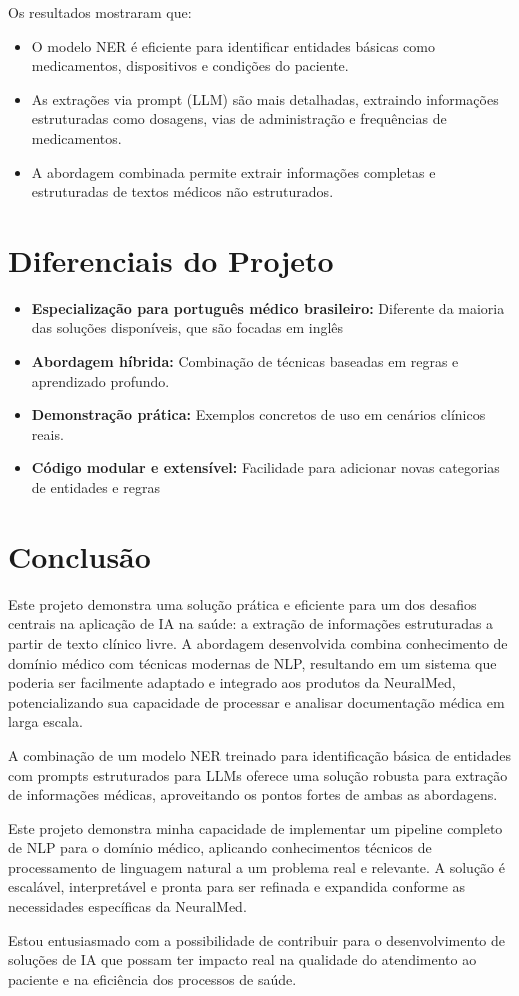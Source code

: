 \documentclass{article}
\begin{document}
\noindent Os resultados mostraram que:
\begin{itemize}
    \item O modelo NER é eficiente para identificar entidades básicas como medicamentos, dispositivos e condições do paciente.
    \item As extrações via prompt (LLM) são mais detalhadas, extraindo informações estruturadas como dosagens, vias de administração e frequências de medicamentos.
    \item A abordagem combinada permite extrair informações completas e estruturadas de textos médicos não estruturados.
\end{itemize}
\section{Diferenciais do Projeto}
\begin{itemize}
    \item \textbf{Especialização para português médico brasileiro:}  Diferente da maioria das soluções disponíveis, que são focadas em inglês
    \item \textbf{Abordagem híbrida:} Combinação de técnicas baseadas em regras e aprendizado profundo.
    \item \textbf{Demonstração prática:} Exemplos concretos de uso em cenários clínicos reais.
    \item \textbf{Código modular e extensível:} Facilidade para adicionar novas categorias de entidades e regras
\end{itemize}
\section{Conclusão}
Este projeto demonstra uma solução prática e eficiente para um dos desafios centrais na aplicação de IA na saúde: a extração de informações estruturadas a partir de texto clínico livre. A abordagem desenvolvida combina conhecimento de domínio médico com técnicas modernas de NLP, resultando em um sistema que poderia ser facilmente adaptado e integrado aos produtos da NeuralMed, potencializando sua capacidade de processar e analisar documentação médica em larga escala. 

\noindent A combinação de um modelo NER treinado para identificação básica de entidades com prompts estruturados para LLMs oferece uma solução robusta para extração de informações médicas, aproveitando os pontos fortes de ambas as abordagens.

\noindent Este projeto demonstra minha capacidade de implementar um pipeline completo de NLP para o domínio médico, aplicando conhecimentos técnicos de processamento de linguagem natural a um problema real e relevante. A solução é escalável, interpretável e pronta para ser refinada e expandida conforme as necessidades específicas da NeuralMed.

\noindent Estou entusiasmado com a possibilidade de contribuir para o desenvolvimento de soluções de IA que possam ter impacto real na qualidade do atendimento ao paciente e na eficiência dos processos de saúde.
\end{document}
